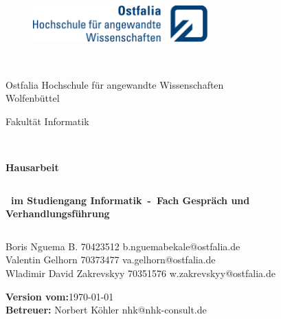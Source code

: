 \thispagestyle{empty}
\begin{figure}[t]
 \centering
 \includegraphics[width=0.6\textwidth]{pictures/ostfaliaLogo}
\end{figure}

\begin{verbatim}


\end{verbatim}

\begin{center}
\Large{Ostfalia Hochschule für angewandte Wissenschaften}\\
\Large{Wolfenbüttel}\\
\end{center}

\begin{center}
\Large{Fakultät Informatik}
\end{center}

\begin{verbatim}


\end{verbatim}

\begin{center}
\doublespacing
\textbf{\LARGE{Hausarbeit}}\\
\singlespacing

\begin{verbatim}

\end{verbatim}

\textbf{{~im Studiengang Informatik~-~Fach Gespräch und Verhandlungsführung~}}

\end{center}

\begin{verbatim}

\end{verbatim}

\begin{center}
Boris Nguema B. 70423512 \Letter  b.nguemabekale@ostfalia.de\\
Valentin Gelhorn 70373477 \Letter  va.gelhorn@ostfalia.de\\
Wladimir David Zakrevskyy 70351576 \Letter  w.zakrevskyy@ostfalia.de\\
\end{center}
\begin{center}
\textbf{Version vom:}\today\\
\textbf{Betreuer:} Norbert Köhler \Letter  nhk@nhk-consult.de\\
\end{center}